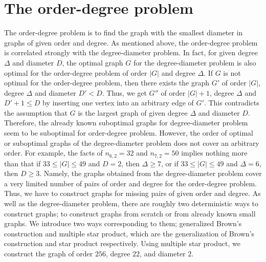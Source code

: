 \documentclass[conference]{IEEEtran}
\begin{document}
\section{The order-degree problem}
The order-degree problem is to find the graph with the smallest diameter in graphs of given order and degree.
As mentioned above, the order-degree problem is correlated strongly with the degree-diameter problem.
In fact, for given degree $\Delta$ and diameter $D$, the optimal graph $G$ for the degree-diameter problem is also
optimal for the order-degree problem of order $|G|$ and degree $\Delta$.
If $G$ is not optimal for the order-degree problem, then there exists the graph $G'$ of order $|G|$, degree $\Delta$ and diameter $D' < D$.
Thus, we get $G''$ of order $|G|+1$, degree $\Delta$ and $D'+1 \leq D$ by inserting one vertex into an arbitrary edge of $G'$.
This contradicts the assumption that $G$ is the largest graph of given degree $\Delta$ and diameter $D$.
Therefore, the already known suboptimal graphs  for degree-diameter problem seem to be suboptimal for order-degree problem.
However, the order of optimal or suboptimal graphs of the degree-diameter problem does not cover an arbitrary order.
For example, the facts of $n_{6,2}=32$ and $n_{7,2}=50$ implies nothing more than
 that if $33 \leq |G| \leq 49$ and $D=2$, then $\Delta \geq 7$, or if $33 \leq |G| \leq 49$ and $\Delta=6$, then $D \geq 3$.
Namely, the graphs obtained from the degree-diameter problem cover a very limited number of pairs of order and degree for the order-degree problem.
Thus, we have to construct graphs for missing pairs of given order and degree.
As well as the degree-diameter problem, there are roughly two deterministic ways to construct graphs;
to construct graphs from scratch or from already known small graphs.
We introduce two ways corresponding to them; generalized Brown's construction and multiple star product,
which are the generalization of Brown's construction and star product respectively.
Using multiple star product, we construct the graph of order $256$, degree $22$, and diameter $2$.
\end{document}
